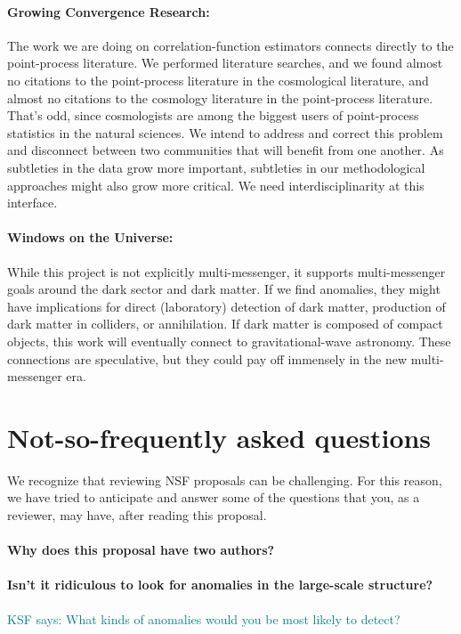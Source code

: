 \documentclass[12pt, fullpage, letterpaper]{article}
\newcommand{\KSF}[1]{\textcolor{teal}{KSF says: #1}}
\begin{document}
\paragraph{Growing Convergence Research:}
The work we are doing on correlation-function estimators connects
directly to the point-process literature. We performed literature
searches, and we found almost no citations to the point-process
literature in the cosmological literature, and almost no citations to
the cosmology literature in the point-process literature. That's odd,
since cosmologists are among the biggest users of point-process
statistics in the natural sciences. We intend to address and correct
this problem and disconnect between two communities that will benefit
from one another. As subtleties in the data grow more important,
subtleties in our methodological approaches might also grow more
critical. We need interdisciplinarity at this interface.

\paragraph{Windows on the Universe:}
While this project is not explicitly multi-messenger, it supports
multi-messenger goals around the dark sector and dark matter. If we
find anomalies, they might have implications for direct (laboratory)
detection of dark matter, production of dark matter in colliders, or
annihilation. If dark matter is composed of compact objects, this work
will eventually connect to gravitational-wave astronomy. These
connections are speculative, but they could pay off immensely in the
new multi-messenger era.

\section{Not-so-frequently asked questions}

We recognize that reviewing NSF proposals can be challenging.
For this reason, we have tried to anticipate and answer some of the
questions that you, as a reviewer, may have, after reading this
proposal.

\paragraph{Why does this proposal have two authors?}

\paragraph{Isn't it ridiculous to look for anomalies in the large-scale structure?} \KSF{What kinds of anomalies would you be most likely to detect?}
\end{document}
